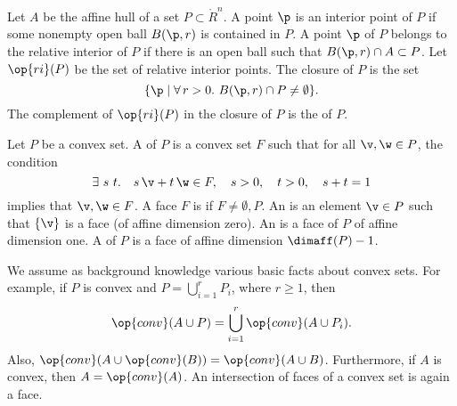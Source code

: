 \begin{definition}
Let
$A$ be the affine hull of a set $P\subset\ring{R}^n$.  A point $\p$ is an interior
point of $P$ if some nonempty open ball $B(\p,r)$ is
contained in $P$.  A point $\p$ of $P$ belongs to the
relative interior of $P$ if there is an open ball such that $B(\p,r)
\cap A\subset P$.  Let $\op{ri}(P)$ be the set of relative interior
points.  The closure of $P$ is the set
\[ 
\{\p \mid \forall\,r >0.~ B(\p,r) \cap P \ne \emptyset\}.
\] 
The complement of $\op{ri}(P)$ in the closure of $P$ is the 
 of $P$.
\end{definition}
%
%
%
%
%
%
%
%
%

\begin{definition}\label{def:face}
Let $P$ be a convex set.  A  of $P$ is a convex set
$F$ such that for all $\v,\w\in P$, the condition
\[ 
\exists~s~t.\quad s\, \v + t\, \w \in F,\quad s>0,\quad t>0,\quad s+t = 1
\]  
implies that $\v,\w\in F$.  A face $F$ is  if $F\ne
\emptyset,P$.  An  is an element $\v\in P$ such that
$\{\v\}$ is a face (of affine dimension zero).  An   is a face of $P$ of
affine dimension one.  A  of $P$ is a 
face of affine dimension $\dimaff(P)-1$.  %
\end{definition}


\begin{remark}\label{rem:convex-background}
We  assume as background knowledge various basic facts about convex sets.
For example,
if $P$ is convex and $P = \bigcup_{i=1}^r P_i$, where $r\ge 1$, then
\[ 
\op{conv}(A\cup P ) = \bigcup_{i=1}^r\op{conv}(A\cup P_i).
\] 
Also, $\op{conv}(A\cup \op{conv}(B)) = \op{conv}(A \cup B)$.
Furthermore, if $A$ is convex, then $A = \op{conv}(A)$.
 An intersection of faces of a
convex set is again a face.
\end{remark}


